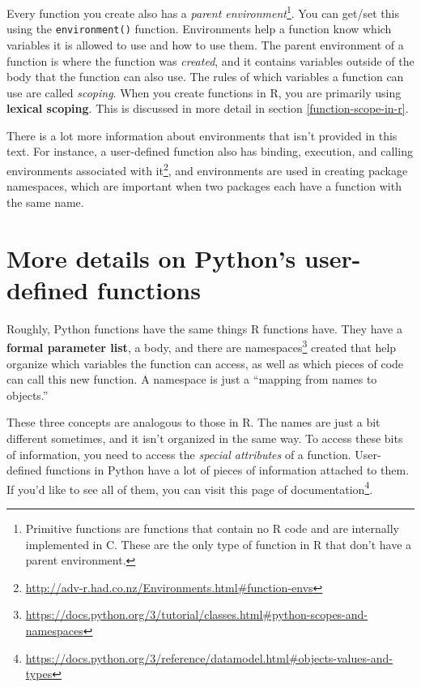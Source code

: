 \documentclass[
  12pt,
  krantz2]{krantz}
\renewcommand{\href}[2]{#2\footnote{\url{#1}}}
\begin{document}
Every function you create also has a \emph{parent environment}\footnote{Primitive functions are functions that contain no R code and are internally implemented in C. These are the only type of function in R that don't have a parent environment.}. You can get/set this using the \texttt{environment()} function. Environments help a function know which variables it is allowed to use and how to use them. The parent environment of a function is where the function was \emph{created}, and it contains variables outside of the body that the function can also use. The rules of which variables a function can use are called \emph{scoping}. When you create functions in R, you are primarily using \textbf{lexical scoping}. This is discussed in more detail in section \ref{function-scope-in-r}.

\begin{rmd-details}
There is a lot more information about environments that isn't provided in this text. For instance, a user-defined function also has \href{http://adv-r.had.co.nz/Environments.html\#function-envs}{binding, execution, and calling environments associated with it}, and environments are used in creating package namespaces, which are important when two packages each have a function with the same name.

\end{rmd-details}

\hypertarget{more-details-on-pythons-user-defined-functions}{%
\section{More details on Python's user-defined functions}\label{more-details-on-pythons-user-defined-functions}}

Roughly, Python functions have the same things R functions have. They have a \textbf{formal parameter list}, a body, and there are \href{https://docs.python.org/3/tutorial/classes.html\#python-scopes-and-namespaces}{namespaces} created that help organize which variables the function can access, as well as which pieces of code can call this new function. A namespace is just a ``mapping from names to objects.''

These three concepts are analogous to those in R. The names are just a bit different sometimes, and it isn't organized in the same way. To access these bits of information, you need to access the \emph{special attributes} of a function. User-defined functions in Python have a lot of pieces of information attached to them. If you'd like to see all of them, you can visit \href{https://docs.python.org/3/reference/datamodel.html\#objects-values-and-types}{this page of documentation}.
\end{document}

